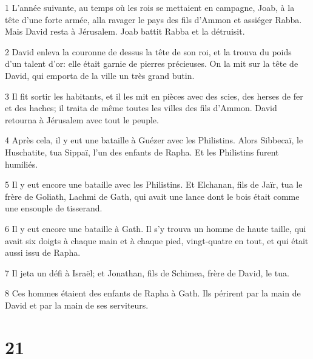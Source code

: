 \par 1 L'année suivante, au temps où les rois se mettaient en campagne, Joab, à la tête d'une forte armée, alla ravager le pays des fils d'Ammon et assiéger Rabba. Mais David resta à Jérusalem. Joab battit Rabba et la détruisit.
\par 2 David enleva la couronne de dessus la tête de son roi, et la trouva du poids d'un talent d'or: elle était garnie de pierres précieuses. On la mit sur la tête de David, qui emporta de la ville un très grand butin.
\par 3 Il fit sortir les habitants, et il les mit en pièces avec des scies, des herses de fer et des haches; il traita de même toutes les villes des fils d'Ammon. David retourna à Jérusalem avec tout le peuple.
\par 4 Après cela, il y eut une bataille à Guézer avec les Philistins. Alors Sibbecaï, le Huschatite, tua Sippaï, l'un des enfants de Rapha. Et les Philistins furent humiliés.
\par 5 Il y eut encore une bataille avec les Philistins. Et Elchanan, fils de Jaïr, tua le frère de Goliath, Lachmi de Gath, qui avait une lance dont le bois était comme une ensouple de tisserand.
\par 6 Il y eut encore une bataille à Gath. Il s'y trouva un homme de haute taille, qui avait six doigts à chaque main et à chaque pied, vingt-quatre en tout, et qui était aussi issu de Rapha.
\par 7 Il jeta un défi à Israël; et Jonathan, fils de Schimea, frère de David, le tua.
\par 8 Ces hommes étaient des enfants de Rapha à Gath. Ils périrent par la main de David et par la main de ses serviteurs.

\chapter{21}

